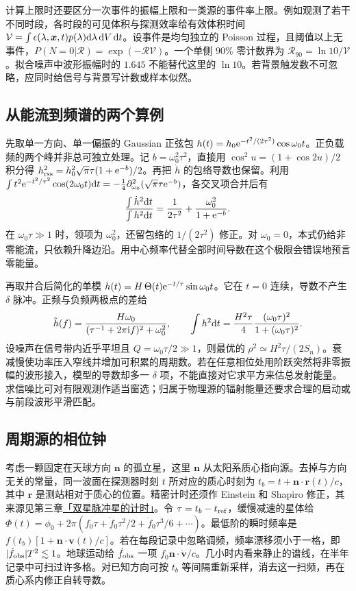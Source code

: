 计算上限时还要区分一次事件的振幅上限和一类源的事件率上限。例如观测了若干不同时段，各时段的可见体积与探测效率给有效体积时间 $\mathcal V=\int \epsilon(\lambda,\bm x,t)p(\lambda)\dd\lambda\,\dd V\,\dd t$。设事件是均匀独立的 Poisson 过程，且阈值以上无事件，$P(N=0|\mathcal R)=\exp(-\mathcal R\mathcal V)$。一个单侧 $90\%$ 零计数界为 $\mathcal R_{90}=\ln10/\mathcal V$。拟合噪声中波形振幅时的 $1.645$ 不能替代这里的 $\ln10$。若背景触发数不可忽略，应同时给信号与背景写计数或样本似然。

\subsection{从能流到频谱的两个算例}
先取单一方向、单一偏振的 Gaussian 正弦包 $h(t)=h_0\mathrm{e}^{-t^2/(2\tau^2)}\cos\omega_0t$。正负载频的两个峰并非总可独立处理。记 $b=\omega_0^2\tau^2$，直接用 $\cos^2 u=(1+\cos2u)/2$ 积分得 $h_{\rm rss}^2=h_0^2\sqrt\pi\tau(1+\mathrm{e}^{-b})/2$。再把 $\dot h$ 的包络导数也保留。利用 $\int t^2\mathrm{e}^{-t^2/\tau^2}\cos(2\omega_0t)\dd t=-\tfrac14\partial_{\omega_0}^2(\sqrt\pi\tau\mathrm{e}^{-b})$，各交叉项合并后有
\[
 \frac{\int\dot h^2\dd t}{\int h^2\dd t}
 =\frac{1}{2\tau^2}+\frac{\omega_0^2}{1+\mathrm{e}^{-b}} .
\]
在 $\omega_0\tau\gg1$ 时，领项为 $\omega_0^2$，还留包络的 $1/(2\tau^2)$ 修正。对 $\omega_0=0$，本式仍给非零能流，只依赖升降边沿。用中心频率代替全部时间导数在这个极限会错误地预言零能量。

再取并合后简化的单模 $h(t)=H\,\Theta(t)\mathrm{e}^{-t/\tau}\sin\omega_0t$。它在 $t=0$ 连续，导数不产生 $\delta$ 脉冲。正频与负频两极点的差给
\[
 \tilde h(f)=\frac{H\omega_0}{(\tau^{-1}+2\pi\mathrm{i} f)^2+\omega_0^2},
 \qquad \int h^2\dd t=\frac{H^2\tau}{4}
       \frac{(\omega_0\tau)^2}{1+(\omega_0\tau)^2}.
\]
设噪声在信号带内近乎平坦且 $Q=\omega_0\tau/2\gg1$，则最优的 $\rho^2\simeq H^2\tau/(2S_n)$。衰减慢使功率压入窄线并增加可积累的周期数。若在任意相位处用阶跃突然将非零振幅的波形接入，模型的导数却多一 $\delta$ 项，不能直接对它求平方来估总发射能量。求信噪比可对有限观测作适当窗选；归属于物理源的辐射能量还要求合理的启动或与前段波形平滑匹配。

\subsection{周期源的相位钟}
考虑一颗固定在天球方向 $\bm n$ 的孤立星，这里 $\bm n$ 从太阳系质心指向源。去掉与方向无关的常量，同一波面在探测器时刻 $t$ 所对应的质心时刻为 $t_b=t+\bm n\cdot\bm r(t)/c$，其中 $\bm r$ 是测站相对于质心的位置。精密计时还须作 Einstein 和 Shapiro 修正，其来源见第三章\hyperlink{subsection.3.13.1}{「双星脉冲星的计时」}。令 $\tau=t_b-t_{\rm ref}$，缓慢减速的星体给 $\Phi(t)=\phi_0+2\pi(f_0\tau+\dot f_0\tau^2/2+\ddot f_0\tau^3/6+\cdots)$。最低阶的瞬时频率是 $f(t_b)[1+\bm n\cdot\bm v(t)/c]$。若在每段记录中忽略调频，频率漂移须小于一格，即 $|\dot f_{\rm obs}|T^2\lesssim1$。地球运动给 $\dot f_{\rm obs}$ 一项 $f_0\bm n\cdot\dot{\bm v}/c$。几小时内看来静止的谱线，在半年记录中可扫过许多格。对已知方向可按 $t_b$ 等间隔重新采样，消去这一扫频，再在质心系内修正自转导数。

